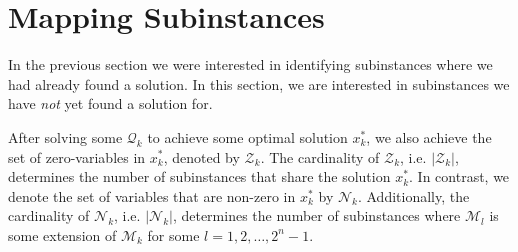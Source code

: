 \section{Mapping Subinstances}
In the previous section we were interested in identifying subinstances where
we had already found a solution. In this section, we are interested in
subinstances we have \emph{not} yet found a solution for.

After solving some $\mathcal{Q}_k$ to achieve some optimal solution $x_k^*$, we
also achieve the set of zero-variables in $x_k^*$, denoted by $\mathcal{Z}_k$.
The cardinality of $\mathcal{Z}_k$, i.e. $|\mathcal{Z}_k|$, determines the
number of subinstances that share the solution $x_k^*$. In contrast, we denote
the set of variables that are non-zero in $x_k^*$ by $\mathcal{N}_k$.
Additionally, the cardinality of $\mathcal{N}_k$, i.e. $|\mathcal{N}_k|$,
determines the number of subinstances where $\mathcal{M}_l$ is some 
extension of $\mathcal{M}_k$ for some $l=1,2,\ldots,2^n-1$.
